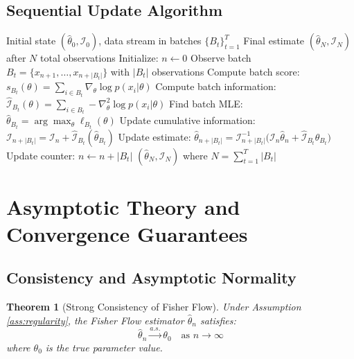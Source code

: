 \documentclass[11pt]{article}
\newtheorem{theorem}{Theorem}
\begin{document}
\subsection{Sequential Update Algorithm}

\begin{algorithm}[h]
\caption{Fisher Flow Sequential Update}
\label{alg:lpi_sequential}
\begin{algorithmic}[1]
\Require Initial state $(\hat{\theta}_0, \mathcal{I}_0)$, data stream in batches $\{B_t\}_{t=1}^T$
\Ensure Final estimate $(\hat{\theta}_N, \mathcal{I}_N)$ after $N$ total observations
\State Initialize: $n \gets 0$ 
 
\State Observe batch $B_t = \{x_{n+1}, \ldots, x_{n+|B_t|}\}$ with $|B_t|$ observations
\State Compute batch score: $s_{B_t}(\theta) = \sum_{i \in B_t} \nabla_\theta \log p(x_i|\theta)$
\State Compute batch information: $\hat{\mathcal{I}}_{B_t}(\theta) = \sum_{i \in B_t} -\nabla^2_\theta \log p(x_i|\theta)$
\State Find batch MLE: $\hat{\theta}_{B_t} = \arg\max_\theta \ell_{B_t}(\theta)$
\State Update cumulative information: $\mathcal{I}_{n+|B_t|} = \mathcal{I}_n + \hat{\mathcal{I}}_{B_t}(\hat{\theta}_{B_t})$
\State Update estimate: $\hat{\theta}_{n+|B_t|} = \mathcal{I}_{n+|B_t|}^{-1}\big(\mathcal{I}_n\hat{\theta}_n + \hat{\mathcal{I}}_{B_t}\hat{\theta}_{B_t}\big)$
\State Update counter: $n \gets n + |B_t|$
\EndFor
\State \Return $(\hat{\theta}_N, \mathcal{I}_N)$ where $N = \sum_{t=1}^T |B_t|$
\end{algorithmic}
\end{algorithm}

\section{Asymptotic Theory and Convergence Guarantees}

\subsection{Consistency and Asymptotic Normality}

\begin{theorem}[Strong Consistency of Fisher Flow]
\label{thm:consistency}
Under Assumption \ref{ass:regularity}, the Fisher Flow estimator $\hat{\theta}_n$ satisfies:
\begin{equation}
\hat{\theta}_n \xrightarrow{a.s.} \theta_0 \quad \text{as } n \to \infty
\end{equation}
where $\theta_0$ is the true parameter value.
\end{theorem}
\end{document}
